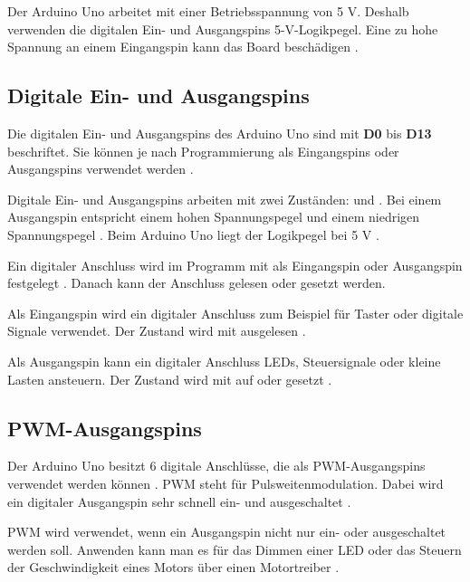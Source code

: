 Der Arduino Uno arbeitet mit einer Betriebsspannung von 5 V. Deshalb verwenden die digitalen Ein- und Ausgangspins 5-V-Logikpegel. Eine zu hohe Spannung an einem Eingangspin kann das Board beschädigen \cite{arduino:uno-datasheet}.

\subsection{Digitale Ein- und Ausgangspins}



Die digitalen Ein- und Ausgangspins des Arduino Uno sind mit \textbf{D0} bis \textbf{D13} beschriftet. Sie können je nach Programmierung als Eingangspins oder Ausgangspins verwendet werden \cite{arduino:uno-r3}\cite{arduino:uno-datasheet}.

Digitale Ein- und Ausgangspins arbeiten mit zwei Zuständen:  und . Bei einem Ausgangspin entspricht  einem hohen Spannungspegel und  einem niedrigen Spannungspegel \cite{arduino_digitalwrite}. Beim Arduino Uno liegt der Logikpegel bei 5 V \cite{arduino:uno-datasheet}.



Ein digitaler Anschluss wird im Programm mit  als Eingangspin oder Ausgangspin festgelegt \cite{arduino_pinmode}. Danach kann der Anschluss gelesen oder gesetzt werden.

Als Eingangspin wird ein digitaler Anschluss zum Beispiel für Taster oder digitale Signale verwendet. Der Zustand wird mit  ausgelesen \cite{arduino_digitalread}.

Als Ausgangspin kann ein digitaler Anschluss LEDs, Steuersignale oder kleine Lasten ansteuern. Der Zustand wird mit  auf  oder  gesetzt \cite{arduino_digitalwrite}.


\subsection{PWM-Ausgangspins}



Der Arduino Uno besitzt 6 digitale Anschlüsse, die als PWM-Ausgangspins verwendet werden können \cite{arduino:uno-r3}. PWM steht für Pulsweitenmodulation. Dabei wird ein digitaler Ausgangspin sehr schnell ein- und ausgeschaltet \cite{arduino:analogwrite}.

PWM wird verwendet, wenn ein Ausgangspin nicht nur ein- oder ausgeschaltet werden soll. Anwenden kann man es für das Dimmen einer LED oder das Steuern der Geschwindigkeit eines Motors über einen Motortreiber \cite{arduino:analogwrite}.



